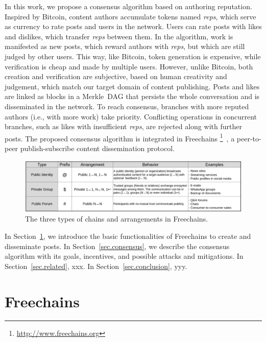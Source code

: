 \documentclass[10pt,journal,compsoc]{IEEEtran}
\newcommand{\FC}   {Freechains\xspace}
\newcommand{\reps} {\emph{reps}\xspace}
\begin{document}
In this work, we propose a consensus algorithm based on authoring reputation.
Inspired by Bitcoin, content authors accumulate tokens named \reps, which
serve as currency to rate posts and users in the network.
Users can rate posts with likes and dislikes, which transfer \reps between
them.
In the algorithm, work is manifested as new posts, which reward authors with
\reps, but which are still judged by other users.
This way, like Bitcoin, token generation is expensive, while verification is
cheap and made by multiple users.
However, unlike Bitcoin, both creation and verification are subjective, based
on human creativity and judgement, which match our target domain of content
publishing.
Posts and likes are linked as blocks in a Merkle~DAG that persists the whole
conversation and is disseminated in the network.
To reach consensus, branches with more reputed authors (i.e., with more work)
take priority.
Conflicting operations in concurrent branches, such as likes with insufficient
\reps, are rejected along with further posts.
The proposed consensus algorithm is integrated in Freechains%
\footnote{\url{http://www.freechains.org}}~\cite{fcs.sbseg20},
a peer-to-peer publish-subscribe content dissemination protocol.

\begin{figure}[ht]
\centering
\includegraphics[width=\textwidth]{arrangements.png}
%
%
\caption{The three types of chains and arrangements in \FC.}
\label{fig.table}
\end{figure}

In Section~\ref{sec.freechains}, we introduce the basic functionalities of \FC
to create and disseminate posts.
In Section~\ref{sec.consensus}, we describe the consensus algorithm with its
goals, incentives, and possible attacks and mitigations.
In Section~\ref{sec.related}, xxx.
In Section~\ref{sec.conclusion}, yyy.

\section{Freechains}
\label{sec.freechains}
\end{document}
